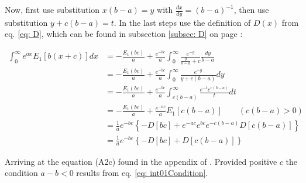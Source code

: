 \documentclass[bibliography=totocnumbered]{scrartcl}
\begin{document}
	Now, first use substitution $x\left(b-a\right)=y$ with $\frac{dx}{dy}=\left(b-a\right)^{-1}$, then use substitution $y+c\left(b-a\right)=t$. In the last steps use the definition of $D\left(x\right)$ from eq. \eqref{eq: D}, which can be found in subsection \ref{subsec: D} on page \pageref{subsec: D}:
	
	\begin{align}
		\int_{0}^{\infty}e^{ax}E_1\left[b\left(x+c\right)\right]dx&=-\frac{E_1\left(bc\right)}{a}+\frac{e^{-bc}}{a}\int_{0}^{\infty}\frac{e^{-y}}{\frac{y}{b-a}+c}\frac{dy}{b-a}\\
		&=-\frac{E_1\left(bc\right)}{a}+\frac{e^{-bc}}{a}\int_{0}^{\infty}\frac{e^{-y}}{y+c\left(b-a\right)}dy\\
		&=-\frac{E_1\left(bc\right)}{a}+\frac{e^{-bc}}{a}\int_{c\left(b-a\right)}^{\infty}\frac{e^{-t}e^{c\left(b-a\right)}}{t}dt\\	&=-\frac{E_1\left(bc\right)}{a}+\frac{e^{-ac}}{a}E_1\left[c\left(b-a\right)\right]\qquad\left(c\left(b-a\right)>0\right)\label{eq: int01Condition}\\
		&=\frac{1}{a}e^{-bc}\left\{-D\left[bc\right]+e^{-ac}e^{bc}e^{-c\left(b-a\right)}D\left[c\left(b-a\right)\right]\right\}\\
		&=\frac{1}{a}e^{-bc}\left\{-D\left[bc\right]+D\left[c\left(b-a\right)\right]\right\}
	\end{align}
	
	Arriving at the equation (A2c) found in the appendix of \cite{boer1990calc}. Provided positive $c$ the condition $a-b<0$ results from eq. \eqref{eq: int01Condition}.
	
	\clearpage
	\printbibliography
\end{document}

